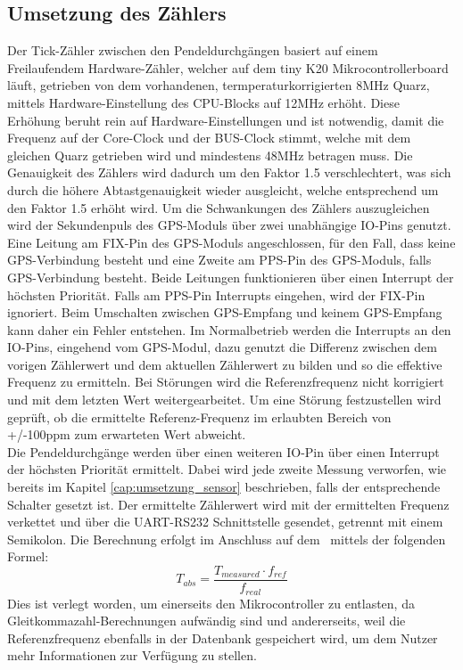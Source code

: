 \subsection{Umsetzung des Zählers}
\label{cap:counter_realisation}
Der Tick-Zähler zwischen den Pendeldurchgängen basiert auf einem Freilaufendem Hardware-Zähler, welcher auf dem tiny K20 Mikrocontrollerboard läuft, getrieben von dem vorhandenen, termperaturkorrigierten 8MHz Quarz, mittels Hardware-Einstellung des CPU-Blocks auf 12MHz erhöht. Diese Erhöhung beruht rein auf Hardware-Einstellungen und ist notwendig, damit die Frequenz auf der Core-Clock und der BUS-Clock stimmt, welche mit dem gleichen Quarz getrieben wird und mindestens 48MHz betragen muss. Die Genauigkeit des Zählers wird dadurch um den Faktor 1.5 verschlechtert, was sich durch die höhere Abtastgenauigkeit wieder ausgleicht, welche entsprechend um den Faktor 1.5 erhöht wird.
Um die Schwankungen des Zählers auszugleichen wird der Sekundenpuls des GPS-Moduls über zwei unabhängige IO-Pins genutzt. Eine Leitung am FIX-Pin des GPS-Moduls angeschlossen, für den Fall, dass keine GPS-Verbindung besteht und eine Zweite am PPS-Pin des GPS-Moduls, falls GPS-Verbindung besteht.
Beide Leitungen funktionieren über einen Interrupt der höchsten Priorität. Falls am PPS-Pin Interrupts eingehen, wird der FIX-Pin ignoriert. Beim Umschalten zwischen GPS-Empfang und keinem GPS-Empfang kann daher ein Fehler entstehen. Im Normalbetrieb werden die Interrupts an den IO-Pins, eingehend vom GPS-Modul, dazu genutzt die Differenz zwischen dem vorigen Zählerwert und dem aktuellen Zählerwert zu bilden und so die effektive Frequenz zu ermitteln. Bei Störungen wird die Referenzfrequenz nicht korrigiert und mit dem letzten Wert weitergearbeitet. Um eine Störung festzustellen wird geprüft, ob die ermittelte Referenz-Frequenz im erlaubten Bereich von +/-100ppm zum erwarteten Wert abweicht.\\ 
Die Pendeldurchgänge werden über einen weiteren IO-Pin über einen Interrupt der höchsten Priorität ermittelt. Dabei wird jede zweite Messung verworfen, wie bereits im Kapitel \ref{cap:umsetzung_sensor} beschrieben, falls der entsprechende Schalter gesetzt ist. Der ermittelte Zählerwert wird mit der ermittelten Frequenz verkettet und über die UART-RS232 Schnittstelle gesendet, getrennt mit einem Semikolon. Die Berechnung erfolgt im Anschluss auf dem \rpi\ mittels der folgenden Formel:
\[
	T_{abs} = \frac{T_{measured} \cdot f_{ref}}{f_{real}}
\]
Dies ist verlegt worden, um einerseits den Mikrocontroller zu entlasten, da Gleitkommazahl-Berechnungen aufwändig sind und andererseits, weil die Referenzfrequenz ebenfalls in der Datenbank gespeichert wird, um dem Nutzer mehr Informationen zur Verfügung zu stellen.
